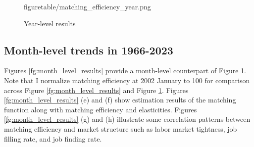 \documentclass[12pt]{article}
\begin{document}
\begin{figure}[!ht]
\begin{center}
{  {figuretable/matching_efficiency_year.png}}
  \\
  \caption{Year-level results}
  \label{fg:year_level_results} 
  \end{center}
  \footnotesize
\end{figure} 


\subsection{Month-level trends in 1966-2023}

Figures \ref{fg:month_level_results} provide a month-level counterpart of Figure \ref{fg:year_level_results}. 
Note that I normalize matching efficiency at 2002 January to 100 for comparison across Figure \ref{fg:month_level_results} and Figure \ref{fg:year_level_results}.
Figures \ref{fg:month_level_results} (e) and (f) show estimation results of the matching function along with matching efficiency and elasticities.
Figures \ref{fg:month_level_results} (g) and (h) illustrate some correlation patterns between matching efficiency and market structure such as labor market tightness, job filling rate, and job finding rate.
\end{document}
